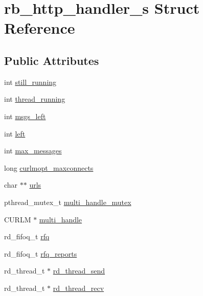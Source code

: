 \hypertarget{structrb__http__handler__s}{\section{rb\-\_\-http\-\_\-handler\-\_\-s Struct Reference}
\label{structrb__http__handler__s}
}
\subsection*{Public Attributes}
\begin{DoxyCompactItemize}
\item 
int \hyperlink{structrb__http__handler__s_aa49e97bedda03106912088dad0b75e64}{still\-\_\-running}
\item 
int \hyperlink{structrb__http__handler__s_a978656c7c89a80d411121107c97a0dcd}{thread\-\_\-running}
\item 
int \hyperlink{structrb__http__handler__s_a803db851c00a617f8a80f00f29d9dba3}{msgs\-\_\-left}
\item 
int \hyperlink{structrb__http__handler__s_a6239490836609d286669af640028ae71}{left}
\item 
int \hyperlink{structrb__http__handler__s_ac8ff888740fc0f4c4365fa08fc7d044f}{max\-\_\-messages}
\item 
long \hyperlink{structrb__http__handler__s_a85973abbda4aeb9332a1b59d6aec69a7}{curlmopt\-\_\-maxconnects}
\item 
char $\ast$$\ast$ \hyperlink{structrb__http__handler__s_a651ea67df6280142010181fb0f418a19}{urls}
\item 
pthread\-\_\-mutex\-\_\-t \hyperlink{structrb__http__handler__s_add4e2b7495e2f20396c2e70ab1a27bf4}{multi\-\_\-handle\-\_\-mutex}
\item 
C\-U\-R\-L\-M $\ast$ \hyperlink{structrb__http__handler__s_a45c0ce1f2e4d154d0194bb60569c0faf}{multi\-\_\-handle}
\item 
rd\-\_\-fifoq\-\_\-t \hyperlink{structrb__http__handler__s_a39160211aefb64ec052138229da98632}{rfq}
\item 
rd\-\_\-fifoq\-\_\-t \hyperlink{structrb__http__handler__s_a383f2047cfcdd9fe49d0deacf770a73c}{rfq\-\_\-reports}
\item 
rd\-\_\-thread\-\_\-t $\ast$ \hyperlink{structrb__http__handler__s_ab7856bbe03f6e21d3c4663b19d043454}{rd\-\_\-thread\-\_\-send}
\item 
rd\-\_\-thread\-\_\-t $\ast$ \hyperlink{structrb__http__handler__s_ac22f049e3d329afb6b7b3eea9310fae8}{rd\-\_\-thread\-\_\-recv}
\end{DoxyCompactItemize}


